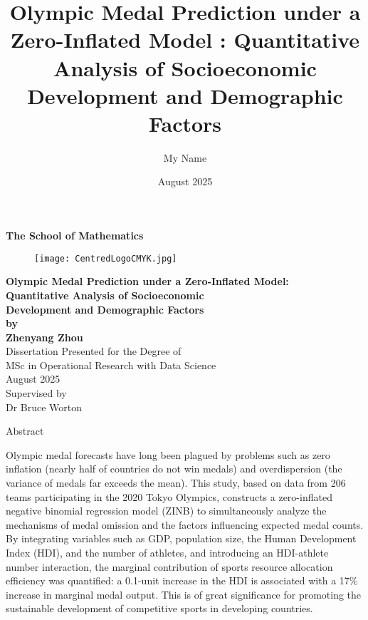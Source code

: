 \documentclass[11pt,twoside]{article}
\title{Olympic Medal Prediction under a Zero-Inflated Model : Quantitative Analysis of Socioeconomic Development and Demographic Factors}
\author{My Name}
\date{August 2025} %
\numberwithin{Theorem}{section}
\numberwithin{Definition}{section}
\numberwithin{Lemma}{section}
\numberwithin{Algorithm}{section}
\numberwithin{equation}{section}
\begin{document}
\pagestyle{empty}

\begin{titlepage}
\vspace*{.5em}
\center
\textbf{\large{The School of Mathematics}} \\
\vspace*{1em}
\begin{figure}[!h]
\centering
\texttt{[image: CentredLogoCMYK.jpg]}
\end{figure}
\vspace{2em}
\textbf{\Huge{Olympic Medal Prediction under a Zero-Inflated Model:}} \\
\textbf{\Huge{Quantitative Analysis of Socioeconomic}} \\
\textbf{\Huge{Development and Demographic Factors}} \\[2em]
\textbf{\LARGE{by}}\\
\vspace{2em}
\textbf{\LARGE{Zhenyang Zhou}}\\
\vspace{6.5em}
\Large{Dissertation Presented for the Degree of\\
MSc in Operational Research with Data Science}\\
\vspace{6.5em}
\Large{August 2025}\\ %
\vspace{3em}
\Large{Supervised by\\Dr Bruce Worton}
\vfill
\end{titlepage}

\cleardoublepage

\begin{center}
\Large{Abstract}
\end{center}

Olympic medal forecasts have long been plagued by problems such as zero inflation (nearly half of countries do not win medals) and overdispersion (the variance of medals far exceeds the mean). This study, based on data from 206 teams participating in the 2020 Tokyo Olympics, constructs a zero-inflated negative binomial regression model (ZINB) to simultaneously analyze the mechanisms of medal omission and the factors influencing expected medal counts. By integrating variables such as GDP, population size, the Human Development Index (HDI), and the number of athletes, and introducing an HDI-athlete number interaction, the marginal contribution of sports resource allocation efficiency was quantified: a 0.1-unit increase in the HDI is associated with a 17\% increase in marginal medal output. This is of great significance for promoting the sustainable development of competitive sports in developing countries.
\end{document}
